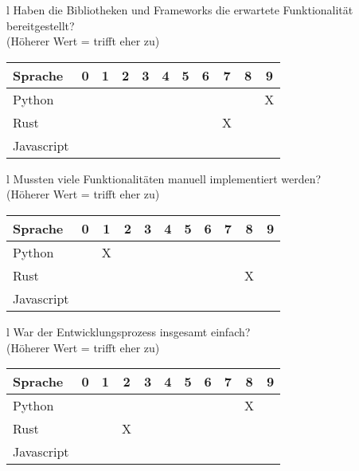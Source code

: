\begin{tabular}{l}
	Haben die Bibliotheken und Frameworks die erwartete Funktionalität bereitgestellt? \\
	(Höherer Wert = trifft eher zu)                                                    \\
	\begin{tabular}{| l | c | c | c | c | c | c | c | c | c | c |}
		\hline
		Sprache    & 0 & 1 & 2 & 3 & 4 & 5 & 6 & 7 & 8 & 9 \\
		\hline
		Python     &   &   &   &   &   &   &   &   &   & X \\
		\hline
		Rust       &   &   &   &   &   &   &   & X &   &   \\
		\hline
		Javascript &   &   &   &   &   &   &   &   &   &   \\
		\hline
	\end{tabular}
\end{tabular}

\begin{tabular}{l}
	Mussten viele Funktionalitäten manuell implementiert werden? \\
	(Höherer Wert = trifft eher zu)                              \\
	\begin{tabular}{| l | c | c | c | c | c | c | c | c | c | c |}
		\hline
		Sprache    & 0 & 1 & 2 & 3 & 4 & 5 & 6 & 7 & 8 & 9 \\
		\hline
		Python     &   & X &   &   &   &   &   &   &   &   \\
		\hline
		Rust       &   &   &   &   &   &   &   &   & X &   \\
		\hline
		Javascript &   &   &   &   &   &   &   &   &   &   \\
		\hline
	\end{tabular}
\end{tabular}

\begin{tabular}{l}
	War der Entwicklungsprozess insgesamt einfach? \\
	(Höherer Wert = trifft eher zu)                \\
	\begin{tabular}{| l | c | c | c | c | c | c | c | c | c | c |}
		\hline
		Sprache    & 0 & 1 & 2 & 3 & 4 & 5 & 6 & 7 & 8 & 9 \\
		\hline
		Python     &   &   &   &   &   &   &   &   & X &   \\
		\hline
		Rust       &   &   & X &   &   &   &   &   &   &   \\
		\hline
		Javascript &   &   &   &   &   &   &   &   &   &   \\
		\hline
	\end{tabular}
\end{tabular}



